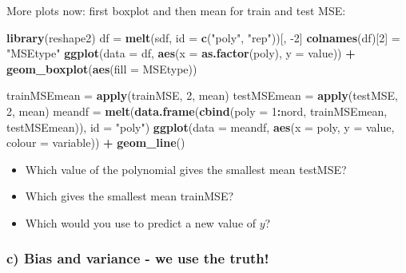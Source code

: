 \documentclass[]{article}
\newenvironment{Shaded}{\begin{snugshade}}{\end{snugshade}}
\newcommand{\DataTypeTok}[1]{\textcolor[rgb]{0.13,0.29,0.53}{#1}}
\newcommand{\DecValTok}[1]{\textcolor[rgb]{0.00,0.00,0.81}{#1}}
\newcommand{\KeywordTok}[1]{\textcolor[rgb]{0.13,0.29,0.53}{\textbf{#1}}}
\newcommand{\NormalTok}[1]{#1}
\newcommand{\OperatorTok}[1]{\textcolor[rgb]{0.81,0.36,0.00}{\textbf{#1}}}
\newcommand{\StringTok}[1]{\textcolor[rgb]{0.31,0.60,0.02}{#1}}
\providecommand{\tightlist}{%
  \setlength{\itemsep}{0pt}\setlength{\parskip}{0pt}}
\begin{document}
More plots now: first boxplot and then mean for train and test MSE:

\begin{Shaded}
\begin{Highlighting}[]
\KeywordTok{library}\NormalTok{(reshape2)}
\NormalTok{df =}\StringTok{ }\KeywordTok{melt}\NormalTok{(sdf, }\DataTypeTok{id =} \KeywordTok{c}\NormalTok{(}\StringTok{"poly"}\NormalTok{, }\StringTok{"rep"}\NormalTok{))[, }\DecValTok{-2}\NormalTok{]}
\KeywordTok{colnames}\NormalTok{(df)[}\DecValTok{2}\NormalTok{] =}\StringTok{ "MSEtype"}
\KeywordTok{ggplot}\NormalTok{(}\DataTypeTok{data =}\NormalTok{ df, }\KeywordTok{aes}\NormalTok{(}\DataTypeTok{x =} \KeywordTok{as.factor}\NormalTok{(poly), }\DataTypeTok{y =}\NormalTok{ value)) }\OperatorTok{+}\StringTok{ }\KeywordTok{geom_boxplot}\NormalTok{(}\KeywordTok{aes}\NormalTok{(}\DataTypeTok{fill =}\NormalTok{ MSEtype))}
\end{Highlighting}
\end{Shaded}

\begin{Shaded}
\begin{Highlighting}[]
\NormalTok{trainMSEmean =}\StringTok{ }\KeywordTok{apply}\NormalTok{(trainMSE, }\DecValTok{2}\NormalTok{, mean)}
\NormalTok{testMSEmean =}\StringTok{ }\KeywordTok{apply}\NormalTok{(testMSE, }\DecValTok{2}\NormalTok{, mean)}
\NormalTok{meandf =}\StringTok{ }\KeywordTok{melt}\NormalTok{(}\KeywordTok{data.frame}\NormalTok{(}\KeywordTok{cbind}\NormalTok{(}\DataTypeTok{poly =} \DecValTok{1}\OperatorTok{:}\NormalTok{nord, trainMSEmean, testMSEmean)), }
    \DataTypeTok{id =} \StringTok{"poly"}\NormalTok{)}
\KeywordTok{ggplot}\NormalTok{(}\DataTypeTok{data =}\NormalTok{ meandf, }\KeywordTok{aes}\NormalTok{(}\DataTypeTok{x =}\NormalTok{ poly, }\DataTypeTok{y =}\NormalTok{ value, }\DataTypeTok{colour =}\NormalTok{ variable)) }\OperatorTok{+}\StringTok{ }
\StringTok{    }\KeywordTok{geom_line}\NormalTok{()}
\end{Highlighting}
\end{Shaded}

\begin{itemize}
\tightlist
\item
  Which value of the polynomial gives the smallest mean testMSE?
\item
  Which gives the smallest mean trainMSE?
\item
  Which would you use to predict a new value of \(y\)?
\end{itemize}

\hypertarget{c-bias-and-variance---we-use-the-truth}{%
\subsubsection{c) Bias and variance - we use the
truth!}\label{c-bias-and-variance---we-use-the-truth}}
\end{document}
